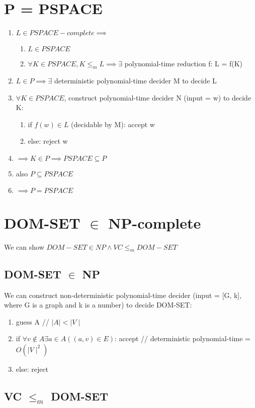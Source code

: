\documentclass{article}
\begin{document}
\section{P = PSPACE}
\begin{enumerate}
	\item $ L \in PSPACE-complete \implies $
	\begin{enumerate}
		\item $ L \in PSPACE $
		\item $ \forall K \in PSPACE, K \leq_m L \implies \exists $ 
		polynomial-time reduction f: L = f(K)
	\end{enumerate}
	\item $ L \in P \implies \exists $ deterministic polynomial-time decider M 
	to decide L
	\item $ \forall K \in PSPACE $, construct polynomial-time decider N (input 
	= w) to decide K:
	\begin{enumerate}
		\item if $ f(w) \in L $ (decidable by M): accept w
		\item else: reject w
	\end{enumerate}
	\item $ \implies K \in P \implies PSPACE \subseteq P $
	\item also $ P \subseteq PSPACE $
	\item $ \implies P = PSPACE $
\end{enumerate}

\section{DOM-SET $ \in $ NP-complete}

We can show $ DOM-SET \in NP \land VC \leq_m DOM-SET $

\subsection{DOM-SET $ \in $ NP}
We can construct non-deterministic polynomial-time decider (input = [G, k], 
where G is a graph and k is a number) to decide DOM-SET:
\begin{enumerate}
	\item guess A // $ \mid A \mid < 
	\mid V \mid $
	\item if $ \forall v \notin A \exists a \in A ((a, v) \in E) $: accept // 
	deterministic polynomial-time = $ O(\mid V \mid ^2) $
	\item else: reject
\end{enumerate}

\subsection{VC $ \leq_m $ DOM-SET}
\end{document}
